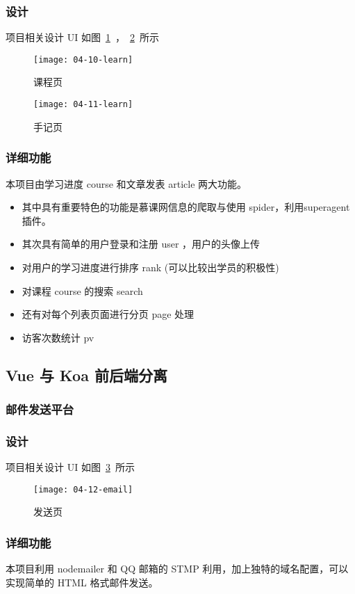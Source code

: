 \subsubsection*{设计}

项目相关设计 UI 如图~\ref{fig:04-10-learn}~，~\ref{fig:04-11-learn}~所示

\begin{figure}[htbp]
\centering
\texttt{[image: 04-10-learn]}
\caption{课程页}
\label{fig:04-10-learn}
\end{figure}

\begin{figure}[htbp]
\centering
\texttt{[image: 04-11-learn]}
\caption{手记页}
\label{fig:04-11-learn}
\end{figure}

\subsubsection*{详细功能}

本项目由学习进度 course 和文章发表 article 两大功能。
\begin{itemize}
  \item 其中具有重要特色的功能是慕课网信息的爬取与使用 spider，利用superagent插件。
  \item 其次具有简单的用户登录和注册 user ，用户的头像上传
  \item 对用户的学习进度进行排序 rank (可以比较出学员的积极性)
  \item 对课程 course 的搜索 search
  \item 还有对每个列表页面进行分页 page 处理
  \item 访客次数统计 pv
\end{itemize}

\subsection{Vue 与 Koa 前后端分离}

\subsubsection{邮件发送平台}

\subsubsection*{设计}

项目相关设计 UI 如图~\ref{fig:04-12-email}~所示

\begin{figure}[htbp]
\centering
\texttt{[image: 04-12-email]}
\caption{发送页}
\label{fig:04-12-email}
\end{figure}

\subsubsection*{详细功能}

本项目利用 nodemailer 和 QQ 邮箱的 STMP 利用，加上独特的域名配置，可以实现简单的 HTML 格式邮件发送。

